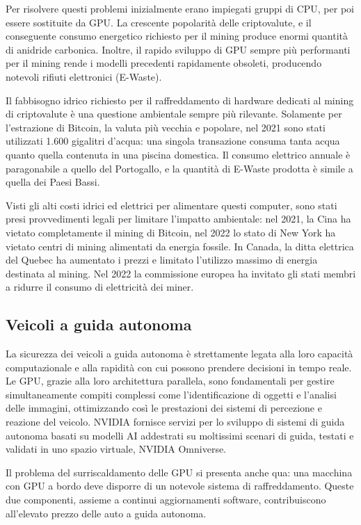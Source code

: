 \documentclass[12pt,a4paper,oneside]{book}
\begin{document}
Per risolvere questi problemi inizialmente erano impiegati gruppi di CPU, per poi essere sostituite da GPU. La crescente popolarità delle criptovalute, e il conseguente consumo energetico richiesto per il mining produce enormi quantità di anidride carbonica. Inoltre, il rapido sviluppo di GPU sempre più performanti per il mining rende i modelli precedenti rapidamente obsoleti, producendo notevoli rifiuti elettronici (E-Waste).

Il fabbisogno idrico richiesto per il raffreddamento di hardware dedicati al mining di criptovalute è una questione ambientale sempre più rilevante. Solamente per l'estrazione di Bitcoin, la valuta più vecchia e popolare, nel 2021 sono stati utilizzati 1.600 gigalitri d'acqua: una singola transazione consuma tanta acqua quanto quella contenuta in una piscina domestica. Il consumo elettrico annuale è paragonabile a quello del Portogallo, e la quantità di E-Waste prodotta è simile a quella dei Paesi Bassi.

Visti gli alti costi idrici ed elettrici per alimentare questi computer, sono stati presi provvedimenti legali per limitare l'impatto ambientale: nel 2021, la Cina ha vietato completamente il mining di Bitcoin, nel 2022 lo stato di New York ha vietato centri di mining alimentati da energia fossile. In Canada, la ditta elettrica del Quebec ha aumentato i prezzi e limitato l'utilizzo massimo di energia destinata al mining. Nel 2022 la commissione europea ha invitato gli stati membri a ridurre il consumo di elettricità dei miner.

\subsection{Veicoli a guida autonoma}

La sicurezza dei veicoli a guida autonoma è strettamente legata alla loro capacità computazionale e alla rapidità con cui possono prendere decisioni in tempo reale. Le GPU, grazie alla loro architettura parallela, sono fondamentali per gestire simultaneamente compiti complessi come l'identificazione di oggetti e l'analisi delle immagini, ottimizzando così le prestazioni dei sistemi di percezione e reazione del veicolo. NVIDIA fornisce servizi per lo sviluppo di sistemi di guida autonoma basati su modelli AI addestrati su moltissimi scenari di guida, testati e validati in uno spazio virtuale, NVIDIA Omniverse.

Il problema del surriscaldamento delle GPU si presenta anche qua: una macchina con GPU a bordo deve disporre di un notevole sistema di raffreddamento. Queste due componenti, assieme a continui aggiornamenti software, contribuiscono all'elevato prezzo delle auto a guida autonoma.
\end{document}
